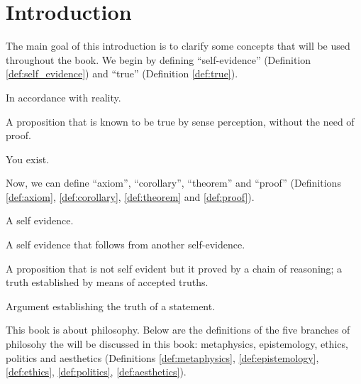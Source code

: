 \chapter{Introduction}

    The main goal of this introduction is to clarify some concepts that will be used throughout the book. We begin by defining ``self-evidence'' (Definition \ref{def:self_evidence}) and ``true'' (Definition \ref{def:true}).

        \begin{definition}[True]
        \label{def:true}
            In accordance with reality.
        \end{definition}

        \begin{definition}
        \label{def:self_evidence}
            A proposition that is known to be true by sense perception, without the need of proof.
        \end{definition}

        \begin{example}
            You exist.
        \end{example}

    Now, we can define ``axiom'', ``corollary'', ``theorem'' and ``proof'' (Definitions \ref{def:axiom}, \ref{def:corollary}, \ref{def:theorem} and \ref{def:proof}).

        \begin{definition}[Axiom]
        \label{def:axiom}
            A self evidence.
        \end{definition}

        \begin{definition}[Corollary]
        \label{def:corollary}
            A self evidence that follows from another self-evidence.
        \end{definition}

        \begin{definition}[Theorem]
        \label{def:theorem}
            A proposition that is not self evident but it proved by a chain of reasoning; a truth established by means of accepted truths.
        \end{definition}

        \begin{definition}[Proof]
        \label{def:proof}
            Argument establishing the truth of a statement.
        \end{definition}

    This book is about philosophy. Below are the definitions of the five branches of philosohy the will be discussed in this book: metaphysics, epistemology, ethics, politics and aesthetics (Definitions \ref{def:metaphysics}, \ref{def:epistemology}, \ref{def:ethics}, \ref{def:politics}, \ref{def:aesthetics}).

